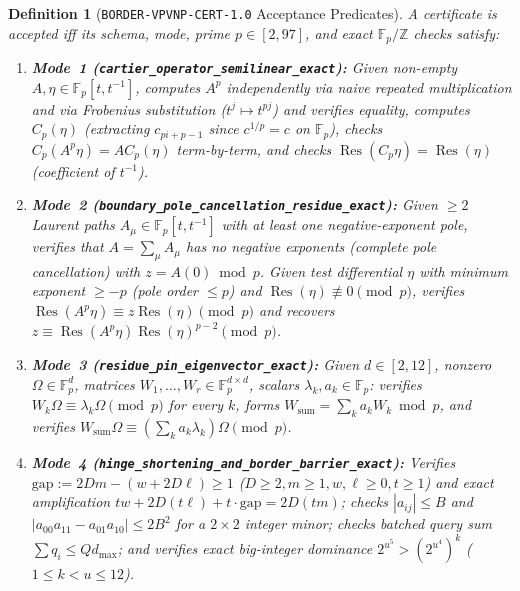 \documentclass[10pt,twocolumn]{article}
\newtheorem{definition}[theorem]{Definition}
\newcommand{\ZZ}{\mathbb{Z}}
\newcommand{\FF}{\mathbb{F}}
\newcommand{\Res}{\operatorname{Res}}
\newcommand{\certschema}{\texttt{BORDER-VPVNP-CERT-1.0}}
\begin{document}
\begin{definition}[\certschema{} Acceptance Predicates]\label{def:spec}
\normalfont A certificate is accepted iff its schema, mode, prime $p\in[2,97]$, and exact $\FF_p/\ZZ$ checks satisfy:
\begin{enumerate}[leftmargin=1.2em,itemsep=1pt,topsep=2pt]
  \item \textbf{Mode~1 (\nolinkurl{cartier_operator_semilinear_exact}):} Given non-empty $A,\eta\in\FF_p[t,t^{-1}]$, computes $A^p$ independently via naive repeated multiplication and via Frobenius substitution ($t^j\mapsto t^{pj}$) and verifies equality, computes $C_p(\eta)$ (extracting $c_{pi+p-1}$ since $c^{1/p}=c$ on $\FF_p$), checks $C_p(A^p\eta) = A C_p(\eta)$ term-by-term, and checks $\Res(C_p\eta)=\Res(\eta)$ (coefficient of $t^{-1}$).
  \item \textbf{Mode~2 (\nolinkurl{boundary_pole_cancellation_residue_exact}):} Given $\ge 2$ Laurent paths $A_\mu\in\FF_p[t,t^{-1}]$ with at least one negative-exponent pole, verifies that $A=\sum_\mu A_\mu$ has \emph{no negative exponents} (complete pole cancellation) with $z = A(0)\bmod p$. Given test differential $\eta$ with minimum exponent $\ge -p$ (pole order $\le p$) and $\Res(\eta)\not\equiv 0\pmod p$, verifies $\Res(A^p\eta)\equiv z\Res(\eta)\pmod p$ and recovers $z \equiv \Res(A^p\eta)\Res(\eta)^{p-2}\pmod p$.
  \item \textbf{Mode~3 (\nolinkurl{residue_pin_eigenvector_exact}):} Given $d\in[2,12]$, nonzero $\Omega\in\FF_p^d$, matrices $W_1,\dots,W_r\in\FF_p^{d\times d}$, scalars $\lambda_k,a_k\in\FF_p$: verifies $W_k\Omega \equiv \lambda_k\Omega\pmod p$ for every $k$, forms $W_{\mathrm{sum}} = \sum_k a_k W_k\bmod p$, and verifies $W_{\mathrm{sum}}\Omega \equiv (\sum_k a_k\lambda_k)\Omega\pmod p$.
  \item \textbf{Mode~4 (\nolinkurl{hinge_shortening_and_border_barrier_exact}):} Verifies $\mathrm{gap}:=2Dm-(w+2D\ell)\ge 1$ ($D\ge 2, m\ge 1, w,\ell\ge 0, t\ge 1$) and exact amplification $tw+2D(t\ell)+t\cdot\mathrm{gap}=2D(tm)$; checks $|a_{ij}|\le B$ and $|a_{00}a_{11}-a_{01}a_{10}|\le 2B^2$ for a $2\times 2$ integer minor; checks batched query sum $\sum q_i \le Q d_{\max}$; and verifies exact big-integer dominance $2^{u^5} > (2^{u^4})^k$ ($1\le k<u\le 12$).
\end{enumerate}
\end{definition}
\end{document}

